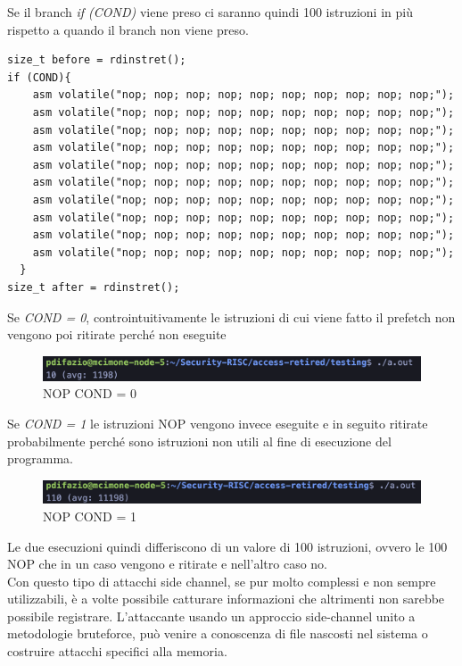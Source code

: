 Se il branch \textit{if (COND)} viene preso ci saranno quindi 100 istruzioni in più rispetto a quando il branch non viene preso.
\begin{verbatim}
size_t before = rdinstret();
if (COND){	
	asm volatile("nop; nop; nop; nop; nop; nop; nop; nop; nop; nop;");
	asm volatile("nop; nop; nop; nop; nop; nop; nop; nop; nop; nop;");
	asm volatile("nop; nop; nop; nop; nop; nop; nop; nop; nop; nop;");
	asm volatile("nop; nop; nop; nop; nop; nop; nop; nop; nop; nop;");
	asm volatile("nop; nop; nop; nop; nop; nop; nop; nop; nop; nop;");
	asm volatile("nop; nop; nop; nop; nop; nop; nop; nop; nop; nop;");
	asm volatile("nop; nop; nop; nop; nop; nop; nop; nop; nop; nop;");
	asm volatile("nop; nop; nop; nop; nop; nop; nop; nop; nop; nop;");
	asm volatile("nop; nop; nop; nop; nop; nop; nop; nop; nop; nop;");
	asm volatile("nop; nop; nop; nop; nop; nop; nop; nop; nop; nop;");
  }
size_t after = rdinstret();
\end{verbatim}
Se \textit{COND = 0}, controintuitivamente le istruzioni di cui viene fatto il prefetch non vengono poi ritirate perché non eseguite 
\FloatBarrier
\vspace{1cm}
\begin{figure}[!htbp]
    \centering
    \includegraphics[width=1\linewidth]{images/nop-false.png}
    \caption{NOP COND = 0}
\end{figure}
\vspace{1cm}
\FloatBarrier
Se \textit{COND = 1} le istruzioni NOP vengono invece eseguite e in seguito ritirate probabilmente perché sono istruzioni non utili al fine di esecuzione del programma.
\FloatBarrier
\vspace{1cm}
\begin{figure}[!htbp]
    \centering
    \includegraphics[width=1\linewidth]{images/nop-true.png}
    \caption{NOP COND = 1}
\end{figure}
\vspace{1cm}
\FloatBarrier
Le due esecuzioni quindi differiscono di un valore di 100 istruzioni, ovvero le 100 NOP che in un caso vengono e ritirate e nell'altro caso no.\\
\newline
Con questo tipo di attacchi side channel, se pur molto complessi e non sempre utilizzabili, è a volte possibile catturare informazioni che altrimenti non sarebbe possibile registrare. L'attaccante usando un approccio side-channel unito a metodologie bruteforce, può venire a conoscenza di file nascosti nel sistema o costruire attacchi specifici alla memoria.
